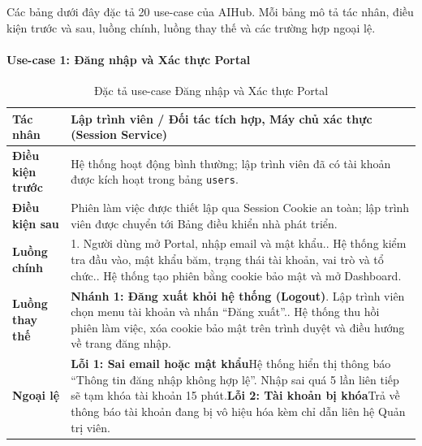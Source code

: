 Các bảng dưới đây đặc tả 20 use-case của AIHub. Mỗi bảng mô tả tác nhân, điều kiện trước và sau, luồng chính, luồng thay thế và các trường hợp ngoại lệ.


\paragraph{Use-case 1: Đăng nhập và Xác thực Portal}

\begingroup
\small
\begin{longtable}{|p{3.2cm}|p{\dimexpr\linewidth-3.2cm-4\tabcolsep-3\arrayrulewidth\relax}|}
\caption{Đặc tả use-case Đăng nhập và Xác thực Portal}
\label{aihub:tab:uc_dev_auth}\\
\hline
\textbf{Tác nhân} & Lập trình viên / Đối tác tích hợp, Máy chủ xác thực (Session Service) \\ \hline
\textbf{Điều kiện trước} & Hệ thống hoạt động bình thường; lập trình viên đã có tài khoản được kích hoạt trong bảng \texttt{users}. \\ \hline
\textbf{Điều kiện sau} & Phiên làm việc được thiết lập qua Session Cookie an toàn; lập trình viên được chuyển tới Bảng điều khiển nhà phát triển. \\ \hline
\textbf{Luồng chính} & 1. Người dùng mở Portal, nhập email và mật khẩu.\newline 2. Hệ thống kiểm tra đầu vào, mật khẩu băm, trạng thái tài khoản, vai trò và tổ chức.\newline 3. Hệ thống tạo phiên bằng cookie bảo mật và mở Dashboard. \\ \hline
\textbf{Luồng thay thế} &
\textbf{Nhánh 1: Đăng xuất khỏi hệ thống (Logout)}\newline 1.1. Lập trình viên chọn menu tài khoản và nhấn ``Đăng xuất''.\newline 1.2. Hệ thống thu hồi phiên làm việc, xóa cookie bảo mật trên trình duyệt và điều hướng về trang đăng nhập. \\ \hline
\textbf{Ngoại lệ} &
\textbf{Lỗi 1: Sai email hoặc mật khẩu}\newline Hệ thống hiển thị thông báo ``Thông tin đăng nhập không hợp lệ''. Nhập sai quá 5 lần liên tiếp sẽ tạm khóa tài khoản 15 phút.\newline \textbf{Lỗi 2: Tài khoản bị khóa}\newline Trả về thông báo tài khoản đang bị vô hiệu hóa kèm chỉ dẫn liên hệ Quản trị viên. \\ \hline
\end{longtable}
\endgroup
